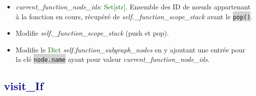 \documentclass[11pt,a4paper]{article}
\newcommand{\code}[1]{\colorbox{lightgray}{\texttt{\small #1}}}
\newcommand{\var}[1]{\textit{#1}}
\newcommand{\vartype}[1]{\textcolor{darkgreen}{#1}}
\newcommand{\methodname}[1]{\textbf{\textcolor{darkblue}{#1}}}
\begin{document}
\begin{description}
\begin{itemize}
        \item \var{current\_function\_node\_ids}: \vartype{Set[str]}. Ensemble des ID de nœuds appartenant à la fonction en cours, récupéré de \var{self.\_function\_scope\_stack} avant le \code{pop()}.
        \item Modifie \var{self.\_function\_scope\_stack} (push et pop).
        \item Modifie le \vartype{Dict} \var{self.function\_subgraph\_nodes} en y ajoutant une entrée pour la clé \code{node.name} ayant pour valeur \var{current\_function\_node\_ids}.
    \end{itemize}
\end{description}

\subsection*{\methodname{visit\_If}}
\end{document}
